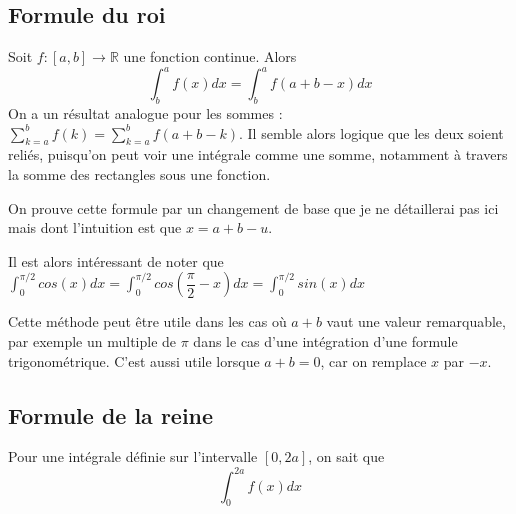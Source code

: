 \documentclass[10pt,a4paper]{book}
\newcommand{\R}{\mathbb{R}}
\begin{document}
\subsection{Formule du roi}
Soit $f:[a,b]\to\R$ une fonction continue. Alors 
\[\int^a_b f(x) dx = \int^a_b f(a+b-x) dx\]
On a un résultat analogue pour les sommes : $\sum^b_{k=a} f(k) = \sum^b_{k=a} f(a+b-k)$. Il semble alors logique que les deux soient reliés, puisqu'on peut voir une intégrale comme une somme, notamment à travers la somme des rectangles sous une fonction.\par 
On prouve cette formule par un changement de base que je ne détaillerai pas ici mais dont l'intuition est que $x=a+b-u$.\par 
Il est alors intéressant de noter que $\int^{\pi/2}_0 cos(x)dx = \int^{\pi/2}_0 cos(\dfrac{\pi}{2}-x)dx = \int^{\pi/2}_0 sin(x)dx$\par 
Cette méthode peut être utile dans les cas où $a+b$ vaut une valeur remarquable, par exemple un multiple de $\pi$ dans le cas d'une intégration d'une formule trigonométrique. C'est aussi utile lorsque $a+b=0$, car on remplace $x$ par $-x$.

\subsection{Formule de la reine}
Pour une intégrale définie sur l'intervalle $[0,2a]$, on sait que 
\[\int^{2a}_0 f(x)dx\]
\end{document}
